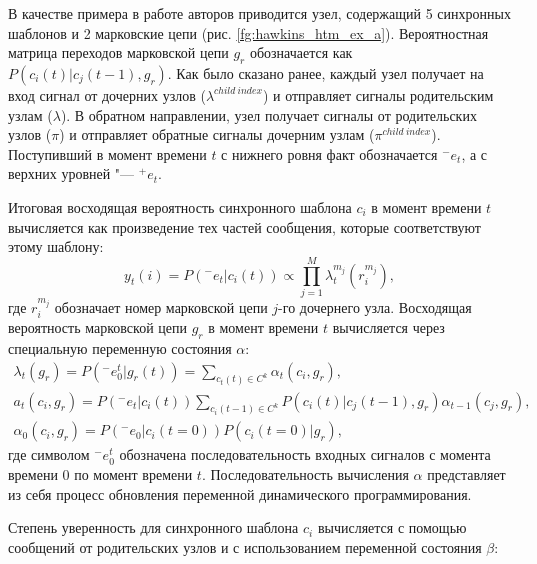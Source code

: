 В качестве примера в работе авторов приводится узел, содержащий 5 синхронных шаблонов и 2 марковские цепи (рис. \ref{fg:hawkins_htm_ex_a}). Вероятностная матрица переходов марковской цепи $g_r$ обозначается как $P(c_i(t)|c_j(t-1),g_r)$. Как было сказано ранее, каждый узел получает на вход сигнал от дочерних узлов ($\lambda^{child\ index}$) и отправляет сигналы родительским узлам ($\lambda$). В обратном направлении, узел получает сигналы от родительских узлов ($\pi$) и отправляет обратные сигналы дочерним узлам ($\pi^{child\ index}$). Поступивший в момент времени $t$ с нижнего ровня факт обозначается ${}^-e_t$, а с верхних уровней "--- ${}^+e_t$.

Итоговая восходящая вероятность синхронного шаблона $c_i$ в момент времени $t$ вычисляется как произведение тех частей сообщения, которые соответствуют этому шаблону:
\begin{equation}
	y_t(i)=P({}^-e_t|c_i(t))\varpropto\prod_{j=1}^{M}\lambda_t^{m_j}(r_i^{m_j}),
\end{equation}
где $r_i^{m_j}$ обозначает номер марковской цепи $j$-го дочернего узла. Восходящая вероятность марковской цепи $g_r$ в момент времени $t$ вычисляется через специальную переменную состояния $\alpha$:
\begin{equation}
	\begin{split}
	\lambda_t(g_r)=P({}^-e_0^t|g_r(t)) = \sum_{c_t(t)\in C^k}\alpha_t(c_i, g_r),\\
	a_t(c_i,g_r )=P({}^-e_t|c_i(t))\sum_{c_i(t-1)\in C^k}P(c_i(t)|c_j(t-1),g_r)\alpha_{t-1}(c_j,g_r),\\
	\alpha_0(c_i,g_r)=P({}^-e_0|c_i(t=0))P(c_i(t=0)|g_r),
	\end{split}
\end{equation}
где символом ${}^-e_0^t$ обозначена последовательность входных сигналов с момента времени $0$ по момент времени $t$. Последовательность вычисления $\alpha$ представляет из себя процесс обновления переменной динамического программирования.

Степень уверенность для синхронного шаблона $c_i$ вычисляется с помощью сообщений от родительских узлов и с использованием переменной состояния $\beta$:

